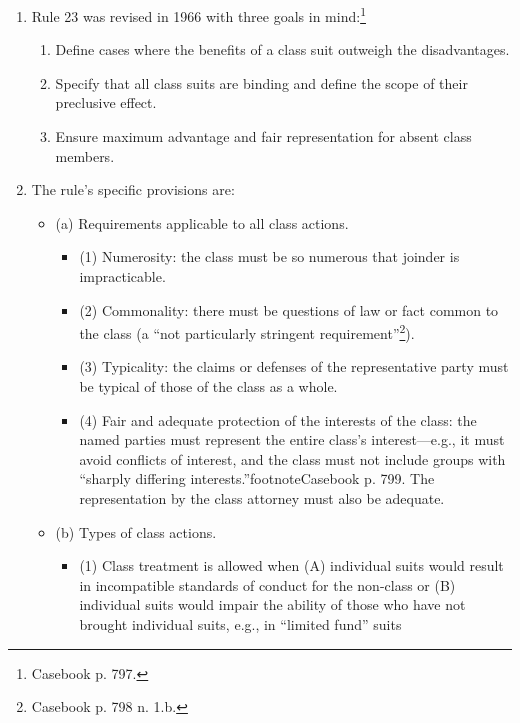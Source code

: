 \begin{enumerate}
    \item Rule 23 was revised in 1966 with three goals in
    mind:\footnote{Casebook p. 797.}
    \begin{enumerate}
        \item Define cases where the benefits of a class suit outweigh the
        disadvantages.
        \item Specify that all class suits are binding and define the scope of
        their preclusive effect.
        \item Ensure maximum advantage and fair representation for absent
        class members.
    \end{enumerate}
    \item The rule's specific provisions are:
    \begin{itemize}
        \item (a) Requirements applicable to all class actions.
        \begin{itemize}
            \item (1) Numerosity: the class must be so numerous that joinder
            is impracticable.
            \item (2) Commonality: there must be questions of law or fact
            common to the class (a ``not particularly stringent
            requirement''\footnote{Casebook p. 798 n. 1.b.}).
            \item (3) Typicality: the claims or defenses of the representative
            party must be typical of those of the class as a whole.
            \item (4) Fair and adequate protection of the interests of the
            class: the named parties must represent the entire class's
            interest---e.g., it must avoid conflicts of interest, and the
            class must not include groups with ``sharply differing
            interests.''footnote{Casebook p. 799.} The representation by the
            class attorney must also be adequate.
        \end{itemize}
        \item (b) Types of class actions.
        \begin{itemize}
            \item (1) Class treatment is allowed when (A) individual suits would
            result in incompatible standards of conduct for the non-class or
            (B) individual suits would impair the ability of those who have
            not brought individual suits, e.g., in ``limited fund'' suits

\end{itemize}
\end{itemize}
\end{enumerate}
